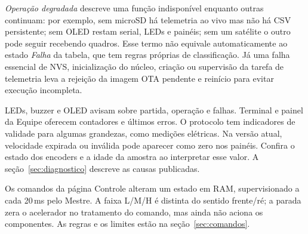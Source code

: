 \emph{Operação degradada} descreve uma função indisponível enquanto outras continuam: por exemplo, sem microSD há telemetria ao vivo mas não há CSV persistente; sem OLED restam serial, LEDs e painéis; sem um satélite o outro pode seguir recebendo quadros. Esse termo não equivale automaticamente ao estado \emph{Falha} da tabela, que tem regras próprias de classificação. Já uma falha essencial de NVS, inicialização do núcleo, criação ou supervisão da tarefa de telemetria leva a rejeição da imagem OTA pendente e reinício para evitar execução incompleta.

LEDs, buzzer e OLED avisam sobre partida, operação e falhas. Terminal e painel da Equipe oferecem contadores e últimos erros. O protocolo tem indicadores de validade para algumas grandezas, como medições elétricas. Na versão atual, velocidade expirada ou inválida pode aparecer como zero nos painéis. Confira o estado dos encoders e a idade da amostra ao interpretar esse valor. A seção~\ref{sec:diagnostico} descreve as causas publicadas.

Os comandos da página Controle alteram um estado em RAM, supervisionado a cada 20\,ms pelo Mestre. A faixa L/M/H é distinta do sentido frente/ré; a parada zera o acelerador no tratamento do comando, mas ainda não aciona os componentes. As regras e os limites estão na seção~\ref{sec:comandos}.

